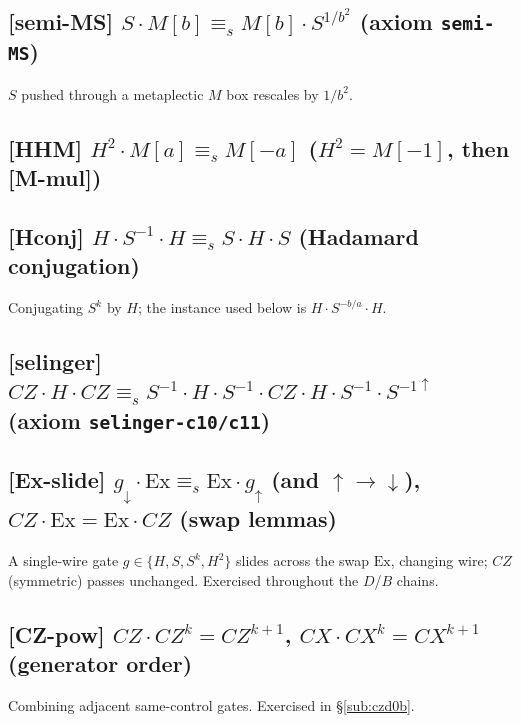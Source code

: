 \documentclass[a4paper]{article}
\newcommand{\lem}[1]{\textsf{[#1]}}      %
\begin{document}
\subsection*{\lem{semi-MS} \; $S\cdot M[b] \equiv_s M[b]\cdot S^{1/b^2}$ \hfill (axiom \texttt{semi-MS})}
$S$ pushed through a metaplectic $M$ box rescales by $1/b^2$.
\begin{center}\end{center}

\subsection*{\lem{HHM} \; $H^2\cdot M[a] \equiv_s M[-a]$ \hfill ($H^2=M[-1]$, then \lem{M-mul})}
\begin{center}\end{center}

\subsection*{\lem{Hconj} \; $H\cdot S^{-1}\cdot H \equiv_s S\cdot H\cdot S$ \hfill (Hadamard conjugation)}
Conjugating $S^{k}$ by $H$; the instance used below is $H\cdot S^{-b/a}\cdot H$.
\begin{center}\end{center}

\subsection*{\lem{selinger} \; $CZ\cdot H\cdot CZ \equiv_s S^{-1}\!\cdot H\cdot S^{-1}\!\cdot CZ\cdot H\cdot S^{-1}\!\cdot S^{-1\uparrow}$ \hfill (axiom \texttt{selinger-c10/c11})}
\begin{center}\end{center}

\subsection*{\lem{Ex-slide} \; $g_\downarrow\cdot \mathrm{Ex} \equiv_s \mathrm{Ex}\cdot g_\uparrow$ \;(and $\uparrow\!\to\!\downarrow$), \quad $CZ\cdot\mathrm{Ex}=\mathrm{Ex}\cdot CZ$ \hfill (swap lemmas)}
A single-wire gate $g\in\{H,S,S^k,H^2\}$ slides across the swap $\mathrm{Ex}$, changing wire;
$CZ$ (symmetric) passes unchanged. Exercised throughout the $D$/$B$ chains.

\subsection*{\lem{CZ-pow} \; $CZ\cdot CZ^{k} = CZ^{k+1}$, \quad $CX\cdot CX^{k}=CX^{k+1}$ \hfill (generator order)}
Combining adjacent same-control gates. Exercised in \S\ref{sub:czd0b}.
\end{document}
